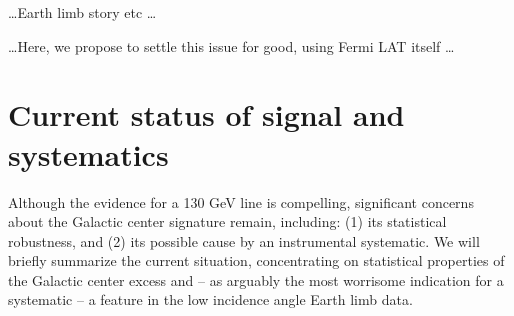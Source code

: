 \documentclass[aps,prd,superscriptaddress,nofootinbib,fixlfloat, 12pt]{revtex4-1}
\newcommand{\Fermi}{{\slshape Fermi}}
\begin{document}

 

\dots Earth limb story etc \dots

\dots Here, we propose to settle this issue for good, using Fermi LAT itself
\dots

\section{Current status of signal and systematics}
Although the evidence for a 130 GeV line is compelling, significant concerns
about the Galactic center signature remain, including: (1) its statistical
robustness, and (2) its possible cause by an instrumental systematic. We will
briefly summarize the current situation, concentrating on statistical
properties of the Galactic center excess and -- as arguably the most worrisome
indication for a systematic -- a feature in the low incidence angle Earth
limb data.
\end{document}
